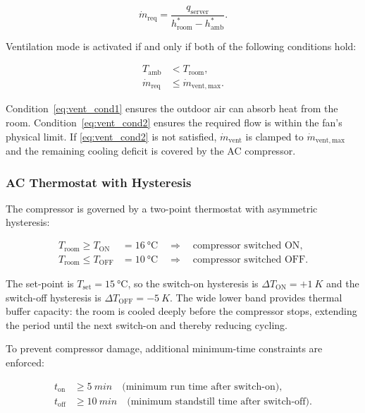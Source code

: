 \documentclass[12pt, a4paper]{article}
\newcommand{\mdot}{\dot{m}}
\newcommand{\hstar}{h^{*}}
\newcommand{\Tamb}{T_{\mathrm{amb}}}
\newcommand{\Troom}{T_{\mathrm{room}}}
\begin{document}
\begin{equation}
  \mdot_{\mathrm{req}}
  = \frac{q_{\mathrm{server}}}{\hstar_{\mathrm{room}} - \hstar_{\mathrm{amb}}}.
  \label{eq:mdot_req}
\end{equation}

Ventilation mode is activated if and only if both of the following conditions hold:

\begin{align}
  \Tamb &< \Troom, \label{eq:vent_cond1}\\[2pt]
  \mdot_{\mathrm{req}} &\leq \mdot_{\mathrm{vent,max}}. \label{eq:vent_cond2}
\end{align}

Condition~\eqref{eq:vent_cond1} ensures the outdoor air can absorb heat from the room.
Condition~\eqref{eq:vent_cond2} ensures the required flow is within the fan's physical limit.
If \eqref{eq:vent_cond2} is not satisfied, $\mdot_{\mathrm{vent}}$ is clamped to
$\mdot_{\mathrm{vent,max}}$ and the remaining cooling deficit is covered by the AC compressor.

\subsubsection{AC Thermostat with Hysteresis}

The compressor is governed by a two-point thermostat with asymmetric hysteresis:

\begin{align}
  \Troom \geq T_{\mathrm{ON}}  &= \SI{16}{\degreeCelsius}
    \quad\Rightarrow\quad \text{compressor switched ON},
    \label{eq:ton}\\[2pt]
  \Troom \leq T_{\mathrm{OFF}} &= \SI{10}{\degreeCelsius}
    \quad\Rightarrow\quad \text{compressor switched OFF}.
    \label{eq:toff}
\end{align}

The set-point is $T_{\mathrm{set}} = \SI{15}{\degreeCelsius}$, so the switch-on hysteresis
is $\Delta T_{\mathrm{ON}} = +\SI{1}{K}$ and the switch-off hysteresis is
$\Delta T_{\mathrm{OFF}} = -\SI{5}{K}$.
The wide lower band provides thermal buffer capacity: the room is cooled deeply before the
compressor stops, extending the period until the next switch-on and thereby reducing cycling.

To prevent compressor damage, additional minimum-time constraints are enforced:

\begin{align}
  t_{\mathrm{on}} &\geq \SI{5}{min} \quad \text{(minimum run time after switch-on)},\\[2pt]
  t_{\mathrm{off}} &\geq \SI{10}{min} \quad \text{(minimum standstill time after switch-off)}.
\end{align}
\end{document}
